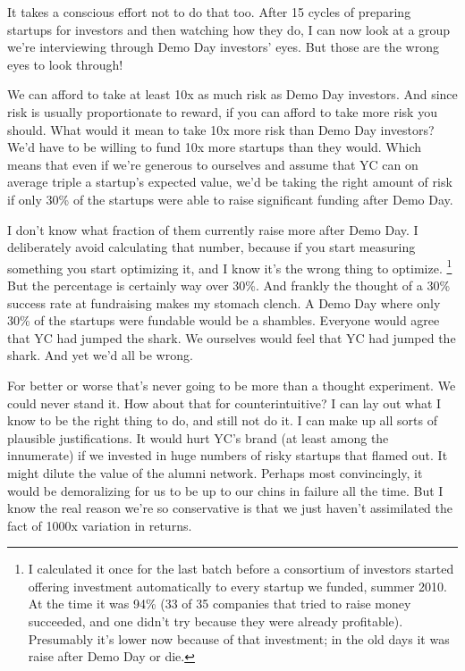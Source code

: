 \documentclass[12pt]{book}
\begin{document}
It takes a conscious effort not to do that too. After 15 cycles of
preparing startups for investors and then watching how they do, I can
now look at a group we're interviewing through Demo Day investors' eyes.
But those are the wrong eyes to look through!

We can afford to take at least 10x as much risk as Demo Day investors.
And since risk is usually proportionate to reward, if you can afford to
take more risk you should. What would it mean to take 10x more risk than
Demo Day investors? We'd have to be willing to fund 10x more startups
than they would. Which means that even if we're generous to ourselves
and assume that YC can on average triple a startup's expected value,
we'd be taking the right amount of risk if only 30\% of the startups
were able to raise significant funding after Demo Day.

I don't know what fraction of them currently raise more after Demo Day.
I deliberately avoid calculating that number, because if you start
measuring something you start optimizing it, and I know it's the wrong
thing to optimize. \footnote{I calculated it once for the last batch before a consortium of
investors started offering investment automatically to every startup we
funded, summer 2010. At the time it was 94\% (33 of 35 companies that
tried to raise money succeeded, and one didn't try because they were
already profitable). Presumably it's lower now because of that
investment; in the old days it was raise after Demo Day or die.} But the percentage is
certainly way over 30\%. And frankly the thought of a 30\% success rate
at fundraising makes my stomach clench. A Demo Day where only 30\% of
the startups were fundable would be a shambles. Everyone would agree
that YC had jumped the shark. We ourselves would feel that YC had jumped
the shark. And yet we'd all be wrong.

For better or worse that's never going to be more than a thought
experiment. We could never stand it. How about that for
counterintuitive? I can lay out what I know to be the right thing to do,
and still not do it. I can make up all sorts of plausible
justifications. It would hurt YC's brand (at least among the innumerate)
if we invested in huge numbers of risky startups that flamed out. It
might dilute the value of the alumni network. Perhaps most convincingly,
it would be demoralizing for us to be up to our chins in failure all the
time. But I know the real reason we're so conservative is that we just
haven't assimilated the fact of 1000x variation in returns.
\end{document}
